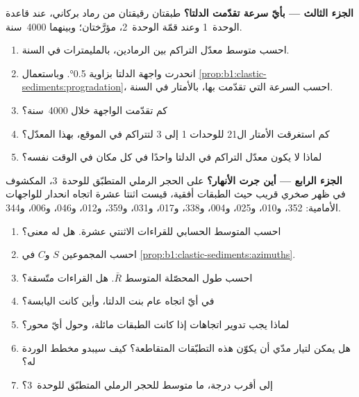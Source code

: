 \begin{problem}
\medskip
\noindent\textbf{الجزء الثالث --- بأيّ سرعة تقدّمت الدلتا؟}
طبقتان رقيقتان من رماد بركاني، عند قاعدة الوحدة~1 وعند قمّة الوحدة~2، مؤرَّختان؛ وبينهما \num{4000}~سنة.
\begin{enumerate}[resume]
  \item احسب متوسط معدّل التراكم بين الرمادين، بالمليمترات في السنة.
  \item انحدرت واجهة الدلتا بزاوية \ang{0.5}. وباستعمال \cref{prop:b1:clastic-sediments:progradation}، احسب السرعة التي تقدّمت بها، بالأمتار في السنة.
  \item كم تقدّمت الواجهة خلال \num{4000}~سنة؟
  \item كم استغرقت الأمتار ال\num{21} للوحدات 1 إلى 3 لتتراكم في الموقع، بهذا المعدّل؟
  \item لماذا لا يكون معدّل التراكم في الدلتا واحدًا في كل مكان في الوقت نفسه؟
\end{enumerate}

\medskip
\noindent\textbf{الجزء الرابع --- أين جرت الأنهار؟}
على الحجر الرملي المتطبّق للوحدة~3، المكشوف في ظهر صخري قريب حيث الطبقات أفقية، قيست اثنتا عشرة اتجاه انحدار للواجهات الأمامية: 352، و\num{010}، و\num{025}، و\num{004}، و\num{338}، و\num{017}، و\num{031}، و\num{359}، و\num{012}، و\num{046}، و\num{006}، و\num{344}.
\begin{enumerate}[resume]
  \item احسب المتوسط الحسابي للقراءات الاثنتي عشرة. هل له معنى؟
  \item احسب المجموعين $S$ و$C$ في \cref{prop:b1:clastic-sediments:azimuths}.
  \item احسب طول المحصّلة المتوسط $\bar R$. هل القراءات متّسقة؟
  \item في أيّ اتجاه عام بنت الدلتا، وأين كانت اليابسة؟
  \item لماذا يجب تدوير اتجاهات  إذا كانت الطبقات مائلة، وحول أيّ محور؟
  \item هل يمكن لتيار مدّي أن يكوّن هذه التطبّقات المتقاطعة؟ كيف سيبدو مخطط الوردة له؟
  \item إلى أقرب درجة، ما متوسط   للحجر الرملي المتطبّق للوحدة~3؟
\end{enumerate}
\end{problem}
